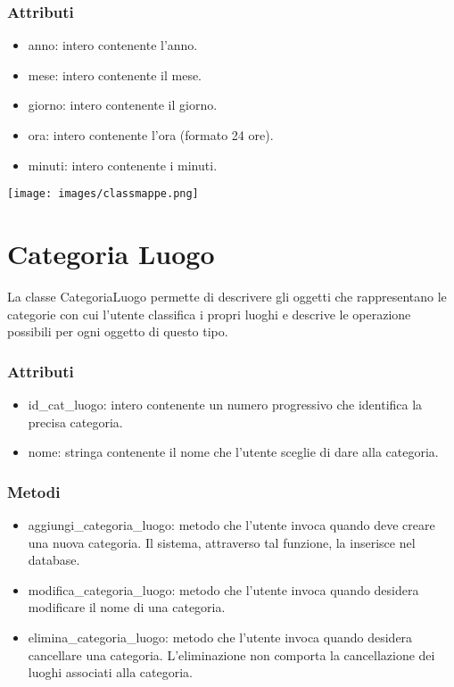 \documentclass[a4paper,12pt]{article}
\begin{document}
\subsubsection*{Attributi}
\begin{itemize} \setlength\itemsep{0.01em}
\item {\ttfamily anno}: intero contenente l'anno.
\item {\ttfamily mese}: intero contenente il mese.
\item {\ttfamily giorno}: intero contenente il giorno.
\item {\ttfamily ora}: intero contenente l'ora (formato 24 ore).
\item {\ttfamily minuti}: intero contenente i minuti.

\end{itemize}
\newpage
\begin{center}
  \texttt{[image: images/classmappe.png]}
\end{center}
\section{Categoria Luogo}
 
La classe {\sffamily CategoriaLuogo} permette di descrivere gli oggetti che rappresentano le categorie con cui l'utente classifica i propri luoghi e descrive le operazione possibili per ogni oggetto di questo tipo.

\subsubsection*{Attributi}
\begin{itemize} \setlength\itemsep{0.01em}
\item {\ttfamily id\_cat\_luogo}: intero contenente un numero progressivo che identifica la precisa categoria.
\item {\ttfamily nome}: stringa contenente il nome che l'utente sceglie di dare alla categoria.
\end{itemize}
\subsubsection*{Metodi}
\begin{itemize} \setlength\itemsep{0.01em}
\item {\ttfamily aggiungi\_categoria\_luogo}: metodo che l'utente invoca quando deve creare una nuova categoria. Il sistema, attraverso tal funzione, la inserisce nel database.
\item {\ttfamily modifica\_categoria\_luogo}: metodo che l'utente invoca quando desidera modificare il nome di una categoria.
\item {\ttfamily elimina\_categoria\_luogo}: metodo che l'utente invoca quando desidera cancellare una categoria. L'eliminazione non comporta la cancellazione dei luoghi associati alla categoria.
\end{itemize}
\end{document}
